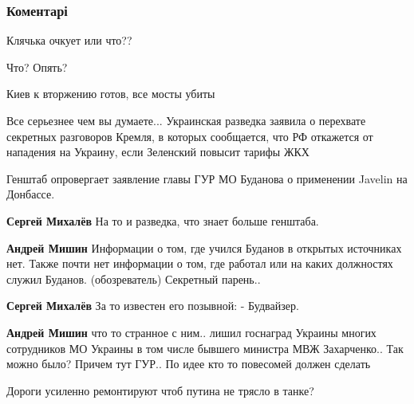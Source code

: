  
 
 
 
 
\subsubsection{Коментарі}
\label{sec:23_11_2021.fb.mishin_andrej.kiev.1.rossia_kiev_klichko.cmt}

\begin{itemize} %
Клячька очкует или что??

Что? Опять?

Киев к вторжению готов, все мосты убиты


Все серьезнее чем вы думаете... Украинская разведка заявила о перехвате
секретных разговоров Кремля, в которых сообщается, что РФ откажется от
нападения на Украину, если Зеленский повысит тарифы ЖКХ


Генштаб опровергает заявление главы ГУР МО Буданова о применении Javelin на
Донбассе.

\begin{itemize} %
\textbf{Сергей Михалёв} На то и разведка, что знает больше генштаба.

\textbf{Андрей Мишин} Информации о том, где учился Буданов в открытых источниках нет. Также почти нет информации о том, где работал или на каких должностях служил Буданов. (обозреватель) Секретный парень..


\textbf{Сергей Михалёв} За то известен его позывной: - Будвайзер.

\textbf{Андрей Мишин} что то странное с ним.. лишил госнаград Украины многих сотрудников МО Украины в том числе бывшего министра МВЖ Захарченко.. Так можно было? Причем тут ГУР.. По идее кто то повесомей должен сделать

\end{itemize} %


Дороги усиленно ремонтируют чтоб путина не трясло в танке?

\end{itemize} %
